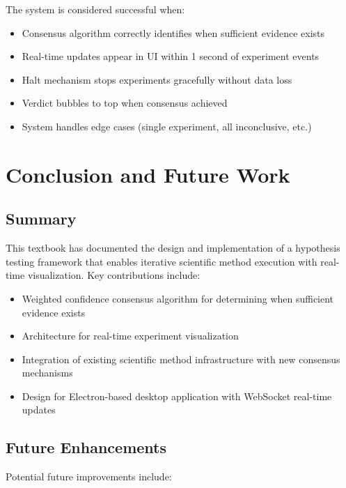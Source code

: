 \documentclass{book}
\begin{document}
The system is considered successful when:

\begin{itemize}
    \item Consensus algorithm correctly identifies when sufficient evidence exists
    \item Real-time updates appear in UI within 1 second of experiment events
    \item Halt mechanism stops experiments gracefully without data loss
    \item Verdict bubbles to top when consensus achieved
    \item System handles edge cases (single experiment, all inconclusive, etc.)
\end{itemize}

\chapter{Conclusion and Future Work}

\section{Summary}

This textbook has documented the design and implementation of a hypothesis testing framework that enables iterative scientific method execution with real-time visualization. Key contributions include:

\begin{itemize}
    \item Weighted confidence consensus algorithm for determining when sufficient evidence exists
    \item Architecture for real-time experiment visualization
    \item Integration of existing scientific method infrastructure with new consensus mechanisms
    \item Design for Electron-based desktop application with WebSocket real-time updates
\end{itemize}

\section{Future Enhancements}

Potential future improvements include:
\end{document}
